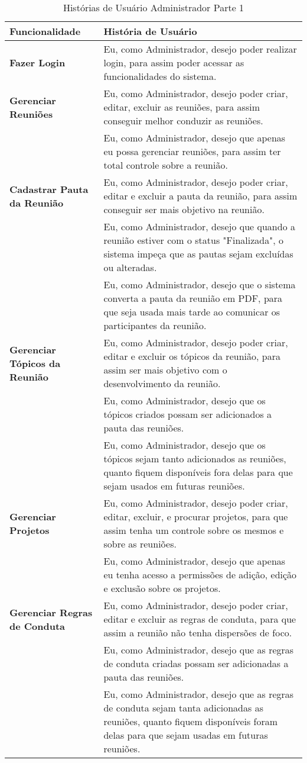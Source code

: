 \begin{table}[H]
	\begin{tabular}{|p{5.0cm}|p{10.0cm}|} 
	\hline
	\textbf{Funcionalidade} & \textbf{História de Usuário} \\ \hline
	\textbf{Fazer Login} & Eu, como Administrador, desejo poder realizar login, para assim poder acessar as funcionalidades do sistema.  \\ \hline
	\textbf{Gerenciar Reuniões} & Eu, como Administrador, desejo poder criar, editar, excluir as reuniões, para assim conseguir melhor conduzir as reuniões.\\ \hline
	& Eu, como Administrador, desejo que apenas eu possa gerenciar reuniões, para assim ter total controle sobre a reunião. \\ \hline
	\textbf{Cadastrar Pauta da Reunião} & Eu, como Administrador, desejo poder criar, editar e excluir a pauta da reunião, para assim conseguir ser mais objetivo na reunião. \\ \hline
	& Eu, como Administrador, desejo que quando a reunião estiver com o status "Finalizada", o sistema impeça que as pautas sejam excluídas ou alteradas. \\ \hline
	& Eu, como Administrador, desejo que o sistema converta a pauta da reunião em PDF, para que seja usada mais tarde ao comunicar os participantes da reunião. \\ \hline
	\textbf{Gerenciar Tópicos da Reunião} & Eu, como Administrador, desejo poder criar, editar e excluir os tópicos da reunião, para assim ser mais objetivo com o desenvolvimento da reunião. 
	\\ \hline
	& Eu, como Administrador, desejo que os tópicos criados possam ser adicionados a pauta das reuniões. \\ \hline
	& Eu, como Administrador, desejo que os tópicos sejam tanto adicionados as reuniões, quanto fiquem disponíveis fora delas para que sejam usados em futuras reuniões. \\ \hline
	\textbf{Gerenciar Projetos} & Eu, como Administrador, desejo poder criar, editar, excluir, e procurar projetos, para que assim tenha um controle sobre os mesmos e sobre as reuniões. \\ \hline
	& Eu, como Administrador, desejo que apenas eu tenha acesso a permissões de adição, edição e exclusão sobre os projetos. \\ \hline
	\textbf{Gerenciar Regras de Conduta} & Eu, como Administrador, desejo poder criar, editar e excluir as regras de conduta, para que assim a reunião não tenha dispersões de foco. \\ \hline
	& Eu, como Administrador, desejo que as regras de conduta criadas possam ser adicionadas a pauta das reuniões. \\ \hline
	& Eu, como Administrador, desejo que as regras de conduta sejam tanta adicionadas as reuniões, quanto fiquem disponíveis foram delas para que sejam usadas em futuras reuniões. \\ \hline
	\end{tabular}
	 \caption{Histórias de Usuário Administrador Parte 1}
	 \label{tab:historias_de_usuario_administrador_parte1}
\end{table}

